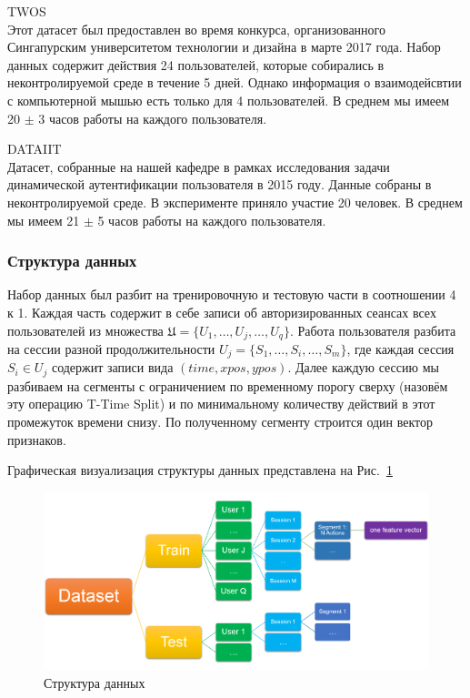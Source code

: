 \documentclass[12pt]{article}
\begin{document}
    \par \textsc{TWOS} \cite{TWOS} \\
    \noindent Этот датасет был предоставлен во время конкурса, организованного Сингапурским университетом технологии и дизайна в марте 2017 года. Набор данных содержит действия 24 пользователей, которые собирались в неконтролируемой среде в течение 5 дней. Однако информация о взаимодейсвтии с компьютерной мышью есть только для 4 пользователей. В среднем мы имеем 20 $\pm$ 3 часов работы на каждого пользователя. \\

    \par \textsc{DATAIIT} \\
    \noindent Датасет, собранные на нашей кафедре в рамках исследования задачи динамической аутентификации пользователя в 2015 году. Данные собраны в неконтролируемой среде. В эксперименте приняло участие 20 человек. В среднем мы имеем 21 $\pm$ 5 часов работы на каждого пользователя. \\


    \subsubsection{Структура данных}
    \label{sec:Research:Data:Struct}
    
    \par Набор данных был разбит на тренировочную и тестовую части в соотношении 4 к 1. Каждая часть содержит в себе записи об авторизированных сеансах всех пользователей из множества $\mathfrak{U}=\{U_1, \ldots, U_j, \ldots, U_q\}$. Работа пользователя разбита на сессии разной продолжительности $U_j = \{S_1, \ldots, S_i, \ldots, S_m\}$, где каждая сессия $S_i \in U_j$ содержит записи вида $(time, xpos, ypos)$. Далее каждую сессию мы разбиваем на сегменты с ограничением по временному порогу сверху (назовём эту операцию T-Time Split) и по минимальному количеству действий в этот промежуток времени снизу. По полученному сегменту строится один вектор признаков. \\
    \par Графическая визуализация структуры данных представлена на Рис.~\ref{sec:Research:Data:Description:fig:DataStructure}

    \begin{figure}[h]
        \centering
        \includegraphics[width=\linewidth]{DataStructure.png}
        \caption{Структура данных}
        \label{sec:Research:Data:Description:fig:DataStructure}
    \end{figure}
\end{document}
